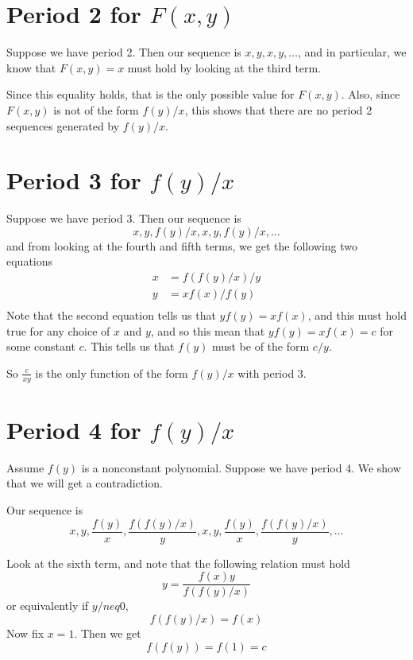 \documentclass[12pt]{article}
\begin{document}
\maketitle


\section{Period 2 for $F(x,y)$}

Suppose we have period 2. Then our sequence is $x,y,x,y,\dots$, and in particular, we know that $F(x,y) = x$ must hold by looking at the third term.

Since this equality holds, that is the only possible value for $F(x,y)$. Also, since $F(x,y)$ is not of the form $f(y)/x$, this shows that there are no period 2 sequences generated by $f(y)/x$.

\section{Period 3 for $f(y)/x$}

Suppose we have period 3. Then our sequence is
\[ x,y,f(y)/x,x,y,f(y)/x,\dots\]
and from looking at the fourth and fifth terms, we get the following two equations
\begin{align*}
x &= f(f(y)/x)/y\\
y &= xf(x)/f(y)\\
\end{align*}
Note that the second equation tells us that $yf(y) = xf(x)$, and this must hold true for any choice of $x$ and $y$, and so this mean that $yf(y) = xf(x) = c$ for some constant $c$. This tells us that $f(y)$ must be of the form $c/y$.

So $\frac{c}{xy}$ is the only function of the form $f(y)/x$ with period 3.

\section{Period 4 for $f(y)/x$}

Assume $f(y)$ is a nonconstant polynomial. Suppose we have period 4. We show that we will get a contradiction.

Our sequence is
\[ x,y,\frac{f(y)}{x},\frac{f(f(y)/x)}{y},x,y,\frac{f(y)}{x},\frac{f(f(y)/x)}{y},\dots\]

Look at the sixth term, and note that the following relation must hold
\[ y = \frac{f(x)y}{f(f(y)/x)} \]
or equivalently if $y /neq 0$,
\[ f(f(y)/x) = f(x) \]
Now fix $x = 1$. Then we get 
\[ f(f(y)) = f(1) = c \]
\end{document}
